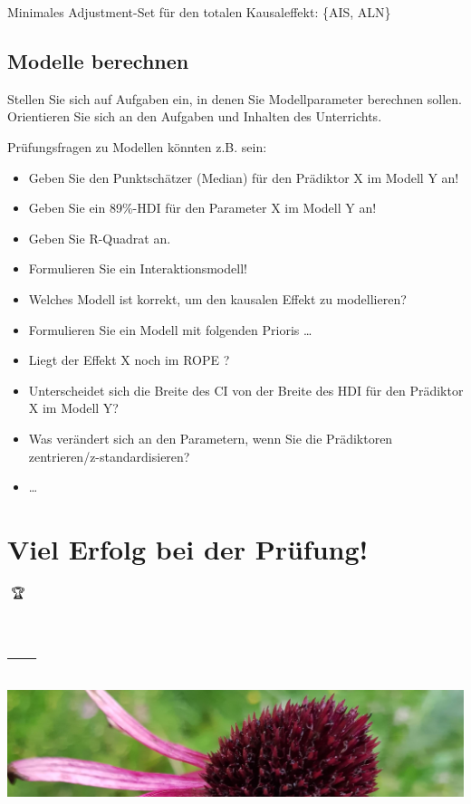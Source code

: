 \documentclass[
  a4paper,
  DIV=11]{scrreprt}
\providecommand{\tightlist}{%
  \setlength{\itemsep}{0pt}\setlength{\parskip}{0pt}}\usepackage{longtable,booktabs,array}
\theoremstyle{definition}
\theoremstyle{remark}
\begin{document}
Minimales Adjustment-Set für den totalen Kausaleffekt: \{AIS, ALN\}

\hypertarget{modelle-berechnen}{%
\subsection{Modelle berechnen}\label{modelle-berechnen}}

Stellen Sie sich auf Aufgaben ein, in denen Sie Modellparameter
berechnen sollen. Orientieren Sie sich an den Aufgaben und Inhalten des
Unterrichts.

Prüfungsfragen zu Modellen könnten z.B. sein:

\begin{itemize}
\tightlist
\item
  Geben Sie den Punktschätzer (Median) für den Prädiktor X im Modell Y
  an!
\item
  Geben Sie ein 89\%-HDI für den Parameter X im Modell Y an!
\item
  Geben Sie R-Quadrat an.
\item
  Formulieren Sie ein Interaktionsmodell!
\item
  Welches Modell ist korrekt, um den kausalen Effekt zu modellieren?
\item
  Formulieren Sie ein Modell mit folgenden Prioris \ldots{}
\item
  Liegt der Effekt X noch im ROPE ?
\item
  Unterscheidet sich die Breite des CI von der Breite des HDI für den
  Prädiktor X im Modell Y?
\item
  Was verändert sich an den Parametern, wenn Sie die Prädiktoren
  zentrieren/z-standardisieren?
\item
  \ldots{}
\end{itemize}

\hypertarget{viel-erfolg-bei-der-pruxfcfung}{%
\section{Viel Erfolg bei der
Prüfung!}\label{viel-erfolg-bei-der-pruxfcfung}}

🥳🏆

\hypertarget{section-11}{%
\section{---}\label{section-11}}

\includegraphics[width=1\textwidth,height=\textheight]{./img/outro-05.jpg}
\end{document}
